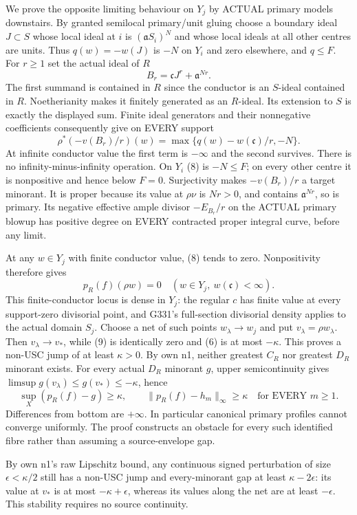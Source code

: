 \documentclass[11pt]{article}
\begin{document}
We prove the opposite limiting behaviour on $Y_j$ by ACTUAL primary
models downstairs. By granted semilocal primary/unit gluing choose a
boundary ideal $J\subset S$ whose local ideal at $i$ is
$(\mathfrak aS_i)^N$ and whose local ideals at all other centres are units.
Thus $q(w)=-w(J)$ is $-N$ on $Y_i$ and zero elsewhere, and $q\le F$.
For $r\ge1$ set the actual ideal of $R$
\[
                  B_r=\mathfrak cJ^r+\mathfrak a^{Nr}.    \tag{7}
\]
The first summand is contained in $R$ since the conductor is an $S$-ideal
contained in $R$. Noetherianity makes it finitely generated as an $R$-ideal.
Its extension to $S$ is exactly the displayed sum. Finite ideal generators
and their nonnegative coefficients consequently give on EVERY support
\[
  \rho^*(-v(B_r)/r)(w)
          =\max\{q(w)-w(\mathfrak c)/r,-N\}.              \tag{8}
\]
At infinite conductor value the first term is $-\infty$ and the second
survives. There is no infinity-minus-infinity operation. On $Y_i$ (8)
is $-N\le F$; on every other centre it is nonpositive and hence below
$F=0$. Surjectivity makes $-v(B_r)/r$ a target minorant. It is proper
because its value at $\rho\nu$ is $Nr>0$, and contains
$\mathfrak a^{Nr}$, so is primary. Its negative effective ample divisor
$-E_{B_r}/r$ on the ACTUAL primary blowup has positive degree on EVERY
contracted proper integral curve, before any limit.

At any $w\in Y_j$ with finite conductor value, (8) tends to zero.
Nonpositivity therefore gives
\[
             p_R(f)(\rho w)=0
             \quad(w\in Y_j,\ w(\mathfrak c)<\infty).    \tag{9}
\]
This finite-conductor locus is dense in $Y_j$: the regular $c$ has finite
value at every support-zero divisorial point, and G331's full-section
divisorial density applies to the actual domain $S_j$. Choose a net of
such points $w_\lambda\to w_j$ and put $v_\lambda=\rho w_\lambda$.
Then $v_\lambda\to v_*$, while (9) is identically zero and (6) is at
most $-\kappa$. This proves a non-USC jump of at least $\kappa>0$.
By own n1, neither greatest $C_R$ nor greatest $D_R$ minorant exists.
For every actual $D_R$ minorant $g$, upper semicontinuity gives
$\limsup g(v_\lambda)\le g(v_*)\le-\kappa$, hence
\[
  \sup_X(p_R(f)-g)\ge\kappa,\qquad
  \|p_R(f)-h_m\|_\infty\ge\kappa\quad\text{for EVERY }m\ge1. \tag{10}
\]
Differences from bottom are $+\infty$. In particular canonical primary
profiles cannot converge uniformly. The proof constructs an obstacle for
every such identified fibre rather than assuming a source-envelope gap.

By own n1's raw Lipschitz bound, any continuous signed perturbation of
size $\epsilon<\kappa/2$ still has a non-USC jump and every-minorant gap
at least $\kappa-2\epsilon$: its value at $v_*$ is at most
$-\kappa+\epsilon$, whereas its values along the net are at least
$-\epsilon$. This stability requires no source continuity.
\end{document}
